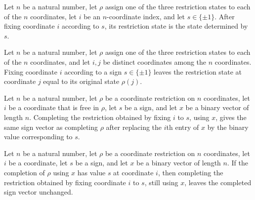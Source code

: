 \begin{theorem}
\label{FABL.CoordRestriction.fixCoordinate_apply_self}
\leanok
{}
Let $n$ be a natural number, let $\rho$ assign one of the three restriction states to
each of the $n$ coordinates, let $i$ be an $n$-coordinate index, and let $s\in\{\pm1\}$.
After fixing coordinate $i$ according to $s$, its restriction state is the state
determined by $s$.
\end{theorem}

\begin{theorem}
\label{FABL.CoordRestriction.fixCoordinate_apply_of_ne}
\leanok
{}
Let $n$ be a natural number, let $\rho$ assign one of the three restriction states to
each of the $n$ coordinates, and let $i,j$ be distinct coordinates among the $n$
coordinates. Fixing coordinate $i$ according to a sign $s\in\{\pm1\}$ leaves the
restriction state at coordinate $j$ equal to its original state $\rho(j)$.
\end{theorem}

\begin{theorem}
\label{FABL.CoordRestriction.complete_fixCoordinate_of_free}
\leanok
{}
Let $n$ be a natural number, let $\rho$ be a coordinate restriction on $n$ coordinates,
let $i$ be a coordinate that is free in $\rho$, let $s$ be a sign, and let $x$ be a
binary vector of length $n$. Completing the restriction obtained by fixing $i$ to $s$,
using $x$, gives the same sign vector as completing $\rho$ after replacing the $i$th
entry of $x$ by the binary value corresponding to $s$.
\end{theorem}

\begin{theorem}
\label{FABL.CoordRestriction.complete_fixCoordinate_eq_of_value}
\leanok
{}
Let $n$ be a natural number, let $\rho$ be a coordinate restriction on $n$ coordinates,
let $i$ be a coordinate, let $s$ be a sign, and let $x$ be a binary vector of length
$n$. If the completion of $\rho$ using $x$ has value $s$ at coordinate $i$, then
completing the restriction obtained by fixing coordinate $i$ to $s$, still using $x$,
leaves the completed sign vector unchanged.
\end{theorem}

